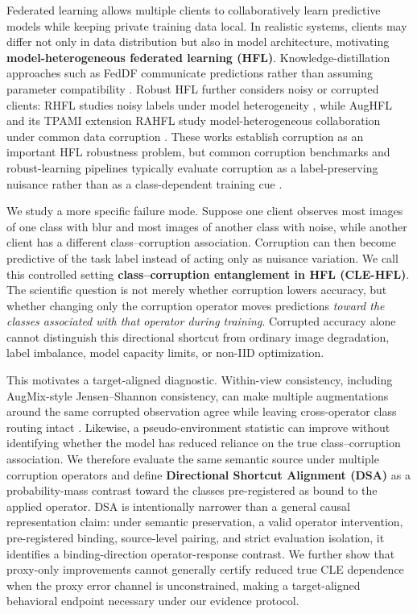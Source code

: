\documentclass[10pt,twocolumn]{article}
\begin{document}
Federated learning allows multiple clients to collaboratively learn predictive models while keeping private training data local. In realistic systems, clients may differ not only in data distribution but also in model architecture, motivating \textbf{model-heterogeneous federated learning (HFL)}. Knowledge-distillation approaches such as FedDF communicate predictions rather than assuming parameter compatibility \citep{lin2020feddf}. Robust HFL further considers noisy or corrupted clients: RHFL studies noisy labels under model heterogeneity \citep{fang2022rhfl}, while AugHFL and its TPAMI extension RAHFL study model-heterogeneous collaboration under common data corruption \citep{fang2023aughfl,fang2025rahfl}. These works establish corruption as an important HFL robustness problem, but common corruption benchmarks and robust-learning pipelines typically evaluate corruption as a label-preserving nuisance rather than as a class-dependent training cue \citep{hendrycks2019corruptions,cubuk2020augmix}.

We study a more specific failure mode. Suppose one client observes most images of one class with blur and most images of another class with noise, while another client has a different class--corruption association. Corruption can then become predictive of the task label instead of acting only as nuisance variation. We call this controlled setting \textbf{class--corruption entanglement in HFL (CLE-HFL)}. The scientific question is not merely whether corruption lowers accuracy, but whether changing only the corruption operator moves predictions \emph{toward the classes associated with that operator during training}. Corrupted accuracy alone cannot distinguish this directional shortcut from ordinary image degradation, label imbalance, model capacity limits, or non-IID optimization.

This motivates a target-aligned diagnostic. Within-view consistency, including AugMix-style Jensen--Shannon consistency, can make multiple augmentations around the same corrupted observation agree while leaving cross-operator class routing intact \citep{cubuk2020augmix}. Likewise, a pseudo-environment statistic can improve without identifying whether the model has reduced reliance on the true class--corruption association. We therefore evaluate the same semantic source under multiple corruption operators and define \textbf{Directional Shortcut Alignment (DSA)} as a probability-mass contrast toward the classes pre-registered as bound to the applied operator. DSA is intentionally narrower than a general causal representation claim: under semantic preservation, a valid operator intervention, pre-registered binding, source-level pairing, and strict evaluation isolation, it identifies a binding-direction operator-response contrast. We further show that proxy-only improvements cannot generally certify reduced true CLE dependence when the proxy error channel is unconstrained, making a target-aligned behavioral endpoint necessary under our evidence protocol.
\end{document}
